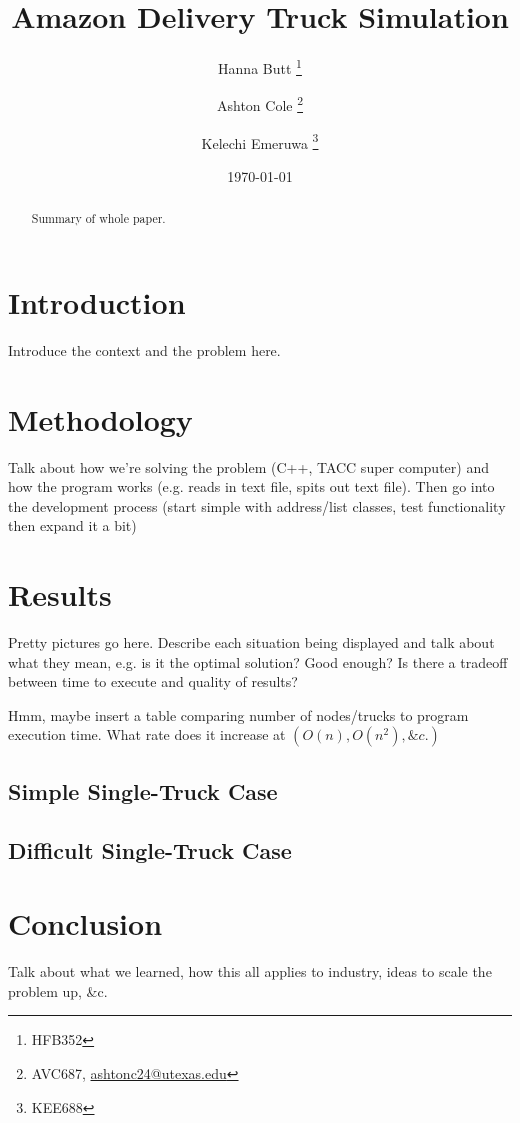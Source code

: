 \documentclass[letterpaper]{article}
\title{Amazon Delivery Truck Simulation}
\author{Hanna Butt \thanks{HFB352} \and Ashton Cole \thanks{AVC687, \href{mailto:ashtonc24@utexas.edu}{ashtonc24@utexas.edu}} \and Kelechi Emeruwa \thanks{KEE688}}
\date{\today}
\begin{document}
    \maketitle

    \begin{abstract}
        Summary of whole paper.
    \end{abstract}

    \section{Introduction}
    Introduce the context and the problem here.

    \section{Methodology}
    Talk about how we're solving the problem (C++, TACC super computer) and how the program works (e.g. reads in text file, spits out text file). Then go into the development process (start simple with address/list classes, test functionality then expand it a bit)

    \section{Results}
    Pretty pictures go here. Describe each situation being displayed and talk about what they mean, e.g. is it the optimal solution? Good enough? Is there a tradeoff between time to execute and quality of results?

    Hmm, maybe insert a table comparing number of nodes/trucks to program execution time. What rate does it increase at $(O(n), O(n^2), \&c.)$

    \subsection{Simple Single-Truck Case}

    \subsection{Difficult Single-Truck Case}

    \section{Conclusion}
    Talk about what we learned, how this all applies to industry, ideas to scale the problem up, \&c.
\end{document}
